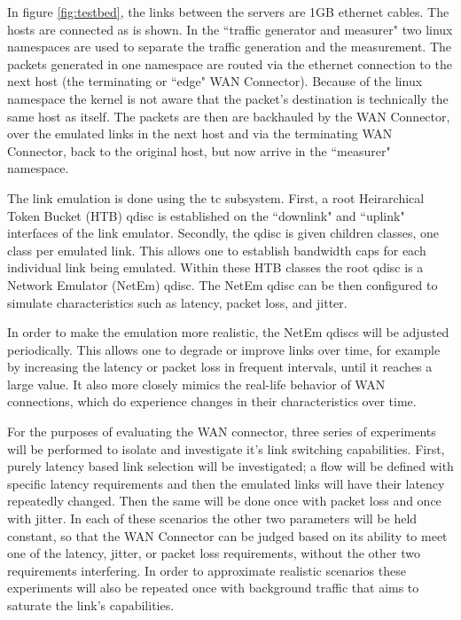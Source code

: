 In figure \ref{fig:testbed}, the links between the servers are 1GB ethernet cables. The hosts are connected as is shown. In the “traffic generator and measurer" two linux namespaces are used to separate the traffic generation and the measurement. The packets generated in one namespace are routed via the ethernet connection to the next host (the terminating or “edge" WAN Connector). Because of the linux namespace the kernel is not aware that the packet's destination is technically the same host as itself. The packets are then are backhauled by the WAN Connector, over the emulated links in the next host and via the terminating WAN Connector, back to the original host, but now arrive in the “measurer" namespace.

The link emulation is done using the tc subsystem. First, a root Heirarchical Token Bucket (HTB) qdisc is established on the “downlink" and “uplink" interfaces of the link emulator. Secondly, the qdisc is given children classes, one class per emulated link. This allows one to establish bandwidth caps for each individual link being emulated. Within these HTB classes the root qdisc is a Network Emulator (NetEm) qdisc. The NetEm qdisc can be then configured to simulate characteristics such as latency, packet loss, and jitter.


In order to make the emulation more realistic, the NetEm qdiscs will be adjusted periodically. This allows one to degrade or improve links over time, for example by increasing the latency or packet loss in frequent intervals, until it reaches a large value. It also more closely mimics the real-life behavior of WAN connections, which do experience changes in their characteristics over time.

For the purposes of evaluating the WAN connector, three series of experiments will be performed to isolate and investigate it's link switching capabilities. First, purely latency based link selection will be investigated; a flow will be defined with specific latency requirements and then the emulated links will have their latency repeatedly changed. Then the same will be done once with packet loss and once with jitter. In each of these scenarios the other two parameters will be held constant, so that the WAN Connector can be judged based on its ability to meet one of the latency, jitter, or packet loss requirements, without the other two requirements interfering. In order to approximate realistic scenarios these experiments will also be repeated once with background traffic that aims to saturate the link's capabilities.

